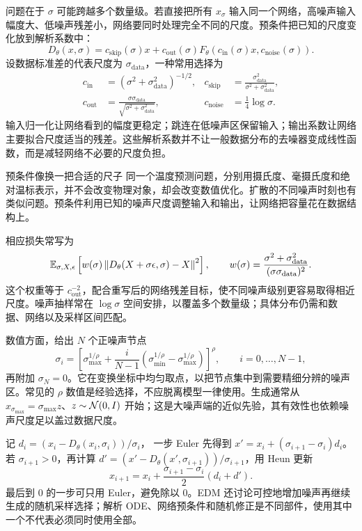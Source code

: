 问题在于 $\sigma$ 可能跨越多个数量级。若直接把所有 $x_\sigma$ 输入同一个网络，高噪声输入幅度大、低噪声残差小，网络要同时处理完全不同的尺度。预条件把已知的尺度变化放到解析系数中：
\begin{equation}
D_\theta(x,\sigma)=c_{\mathrm{skip}}(\sigma)x+
c_{\mathrm{out}}(\sigma)
F_\theta(c_{\mathrm{in}}(\sigma)x,c_{\mathrm{noise}}(\sigma)).
\label{eq:m-edm-precond}
\end{equation}
设数据标准差的代表尺度为 $\sigma_{\mathrm{data}}$，一种常用选择为
\begin{align}
c_{\mathrm{in}}&=(\sigma^2+\sigma_{\mathrm{data}}^2)^{-1/2},
&
c_{\mathrm{skip}}&=\frac{\sigma_{\mathrm{data}}^2}
{\sigma^2+\sigma_{\mathrm{data}}^2},\\
c_{\mathrm{out}}&=\frac{\sigma\sigma_{\mathrm{data}}}
{\sqrt{\sigma^2+\sigma_{\mathrm{data}}^2}},
&
c_{\mathrm{noise}}&=\tfrac14\log\sigma.
\end{align}
输入归一化让网络看到的幅度更稳定；跳连在低噪声区保留输入；输出系数让网络主要拟合尺度适当的残差。这些解析系数并不让一般数据分布的去噪器变成线性函数，而是减轻网络不必要的尺度负担。

\begin{intuitionbox}{预条件像换一把合适的尺子}
同一个温度预测问题，分别用摄氏度、毫摄氏度和绝对温标表示，并不会改变物理对象，却会改变数值优化。扩散的不同噪声时刻也有类似问题。预条件利用已知的噪声尺度调整输入和输出，让网络把容量花在数据结构上。
\end{intuitionbox}

相应损失常写为
\[
 \mathbb{E}_{\sigma,X,\epsilon}
 \left[w(\sigma)\left\lVert D_\theta(X+\sigma\epsilon,\sigma)-X\right\rVert^2\right],
 \qquad
 w(\sigma)=\frac{\sigma^2+\sigma_{\mathrm{data}}^2}
 {(\sigma\sigma_{\mathrm{data}})^2}.
\]
这个权重等于 $c_{\mathrm{out}}^{-2}$，配合重写后的网络残差目标，使不同噪声级别更容易取得相近尺度。噪声抽样常在 $\log\sigma$ 空间安排，以覆盖多个数量级；具体分布仍需和数据、网络以及采样区间匹配。

数值方面，给出 $N$ 个正噪声节点
\[
 \sigma_i=\left[
 \sigma_{\max}^{1/\rho}
 +\frac{i}{N-1}\left(\sigma_{\min}^{1/\rho}
 -\sigma_{\max}^{1/\rho}\right)\right]^\rho,
 \qquad i=0,\ldots,N-1,
\]
再附加 $\sigma_N=0$。它在变换坐标中均匀取点，以把节点集中到需要精细分辨的噪声区。常见的 $\rho$ 数值是经验选择，不应脱离模型一律使用。生成通常从 $x_{\sigma_{\max}}=\sigma_{\max}z$、$z\sim\mathcal{N}(0,I)$ 开始；这是大噪声端的近似先验，其有效性也依赖噪声尺度足以盖过数据尺度。

记 $d_i=(x_i-D_\theta(x_i,\sigma_i))/\sigma_i$，
一步 Euler 先得到 $x'=x_i+(\sigma_{i+1}-\sigma_i)d_i$。
若 $\sigma_{i+1}>0$，再计算
$d'=(x'-D_\theta(x',\sigma_{i+1}))/\sigma_{i+1}$，用 Heun 更新
\begin{equation}
x_{i+1}=x_i+\frac{\sigma_{i+1}-\sigma_i}{2}(d_i+d').
\label{eq:m-heun}
\end{equation}
最后到 0 的一步可只用 Euler，避免除以 0。EDM 还讨论可控地增加噪声再继续生成的随机采样选择；解析 ODE、网络预条件和随机修正是不同部件，使用其中一个不代表必须同时使用全部。

